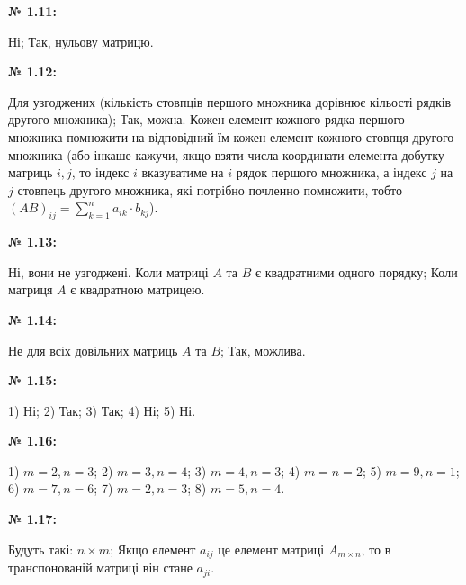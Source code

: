 \documentclass[12pt,a4paper]{article}
\begin{document}
    \vspace{1em}

    \noindent \textbf{№ 1.11:}

    Ні; Так, нульову матрицю.

    \vspace{1em}

    \noindent \textbf{№ 1.12:}

    Для узгоджених (кількість стовпців першого множника дорівнює кільості рядків другого множника);
    Так, можна. Кожен елемент кожного рядка першого множника помножити на відповідний їм кожен елемент кожного стовпця другого множника
    (або інкаше кажучи, якщо взяти числа координати елемента добутку матриць $i, j$, то індекс $i$ вказуватиме на $i$ рядок першого множника, а
    індекс $j$ на $j$ стовпець другого множника, які потрібно почленно помножити, тобто $\displaystyle (AB)_{ij} = \sum_{k=1}^{n} a_{ik} \cdot b_{kj}$).

    \vspace{1em}

    \noindent \textbf{№ 1.13:}

    Ні, вони не узгоджені. Коли матриці $A$ та $B$ є квадратними одного порядку;
    Коли матриця $A$ є квадратною матрицею.

    \vspace{1em}

    \noindent \textbf{№ 1.14:}

    Не для всіх довільних матриць $A$ та $B$; Так, можлива.

    \vspace{1em}

    \noindent \textbf{№ 1.15:}

    1) Ні; 
    2) Так; 
    3) Так;
    4) Ні;
    5) Ні.

    \vspace{1em}

    \noindent \textbf{№ 1.16:}

    1) $m = 2, n = 3$; 
    2) $m = 3, n = 4$; 
    3) $m = 4, n = 3$; 
    4) $m = n = 2$; 
    5) $m = 9, n = 1$; 
    6) $m = 7, n = 6$; 
    7) $m = 2, n = 3$; 
    8) $m = 5, n = 4$.

    \vspace{1em}

    \noindent \textbf{№ 1.17:}

    Будуть такі: $n \times m$; Якщо елемент $a_{ij}$ це елемент матриці $A_{m\times n}$, 
    то в транспонованій матриці він стане $a_{ji}$.
\end{document}
